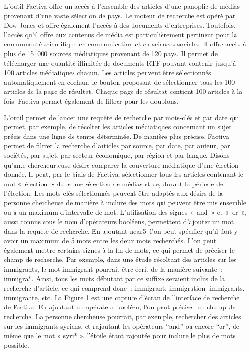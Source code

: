\documentclass[
  letterpaper,
]{scrbook}
\begin{document}
L'outil Factiva offre un accès à l'ensemble des articles d'une panoplie
de médias provenant d'une vaste sélection de pays. Le moteur de
recherche est opéré par Dow Jones et offre également l'accès à des
documents d'entreprises. Toutefois, l'accès qu'il offre aux contenus de
média est particulièrement pertinent pour la communauté scientifique en
communication et en sciences sociales. Il offre accès à plus de 15~000
sources médiatiques provenant de 120 pays. Il permet de télécharger une
quantité illimitée de documents RTF pouvant contenir jusqu'à 100
articles médiatiques chacun. Les articles peuvent être sélectionnés
automatiquement en cochant le bouton proposant de sélectionner tous les
100 articles de la page de résultat. Chaque page de résultat contient
100 articles à la fois. Factiva permet également de filtrer pour les
doublons.

L'outil permet de lancer une requête de recherche par mots-clés et par
date qui permet, par exemple, de récolter les articles médiatiques
concernant un sujet précis dans une ligne de temps déterminée. De
manière plus précise, Factiva permet de filtrer la recherche d'articles
par source, par date, par auteur, par sociétés, par sujet, par secteur
économique, par région et par langue. Disons qu'un.e chercheur.euse
désire comparer la couverture médiatique d'une élection donnée. Il peut,
par le biais de Factiva, sélectionner tous les articles contenant le mot
«~élection~» dans une sélection de médias et ce, durant la période de
l'élection. Les mots clés sélectionnés peuvent être adaptés aux désirs
de la personne chercheuse de manière à inclure des mots qui peuvent être
mis ensemble ou à un maximum d'intervalle de mot. L'utilisation des
signes «~and~» et «~or~», aussi connus sous le nom d'opérateurs
booléens, permettent d'ajouter un mot dans la requête de recherche. En
ajoutant near5, l'on peut spécifier qu'il doit y avoir un maximum de 5
mots entre les deux mots recherchés. L'on peut également mettre certains
signes à la fin de mots, ce qui permet de préciser le champ de
recherche. Par exemple, dans une étude récoltant des articles sur les
immigrants, le mot immigrant pourrait être écrit de la manière
suivante~: immigra*. Ainsi, tous les mots débutant par ce suffixe
seraient inclus de la recherche d'article, ce qui comprend donc~:
immigrant, immigration, immigrants, immigrante, etc. La Figure 1 est une
capture d'écran de l'interface de recherche de Factiva. En ajoutant un
opérateur booléen, l'on peut préciser un champ de recherche. La personne
chercheuse pourrait, par exemple, rechercher des articles sur les
immigrants syriens, et rajoutant les opérateurs ``and'' ou encore
``or'', de même que le mot « syri* », l'étoile étant rajoutée pour
inclure le plus de mots possible.
\end{document}
